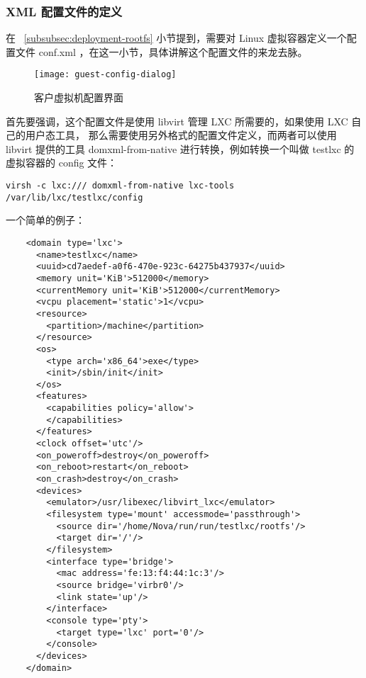 \subsubsection{XML 配置文件的定义}
\label{subsubsec:xml-definition}

在 ~\ref{subsubsec:deployment-rootfs} 小节提到，需要对 Linux 虚拟容器定义一个配置文件
conf.xml ，在这一小节，具体讲解这个配置文件的来龙去脉。

\begin{figure}[h]
    \centering
    \texttt{[image: guest-config-dialog]}
    \caption{客户虚拟机配置界面}
\end{figure}

首先要强调，这个配置文件是使用 libvirt 管理 LXC 所需要的，如果使用 LXC 自己的用户态工具，
那么需要使用另外格式的配置文件定义，而两者可以使用 libvirt 提供的工具 domxml-from-native
进行转换，例如转换一个叫做 testlxc 的虚拟容器的 config 文件：

\begin{lstlisting}
virsh -c lxc:/// domxml-from-native lxc-tools /var/lib/lxc/testlxc/config
\end{lstlisting}

一个简单的例子：

\begin{lstlisting}
    <domain type='lxc'>
      <name>testlxc</name>
      <uuid>cd7aedef-a0f6-470e-923c-64275b437937</uuid>
      <memory unit='KiB'>512000</memory>
      <currentMemory unit='KiB'>512000</currentMemory>
      <vcpu placement='static'>1</vcpu>
      <resource>
        <partition>/machine</partition>
      </resource>
      <os>
        <type arch='x86_64'>exe</type>
        <init>/sbin/init</init>
      </os>
      <features>
        <capabilities policy='allow'>
        </capabilities>
      </features>
      <clock offset='utc'/>
      <on_poweroff>destroy</on_poweroff>
      <on_reboot>restart</on_reboot>
      <on_crash>destroy</on_crash>
      <devices>
        <emulator>/usr/libexec/libvirt_lxc</emulator>
        <filesystem type='mount' accessmode='passthrough'>
          <source dir='/home/Nova/run/run/testlxc/rootfs'/>
          <target dir='/'/>
        </filesystem>
        <interface type='bridge'>
          <mac address='fe:13:f4:44:1c:3'/>
          <source bridge='virbr0'/>
          <link state='up'/>
        </interface>
        <console type='pty'>
          <target type='lxc' port='0'/>
        </console>
      </devices>
    </domain>
\end{lstlisting}

